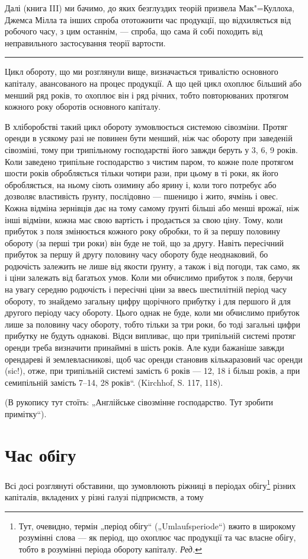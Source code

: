 Далі (книга III) ми бачимо, до яких безглуздих теорій призвела Мак"=Куллоха,
Джемса Мілла та інших спроба ототожнити час продукції, що відхиляється від робочого часу, з
цим останнім, — спроба, що сама й собі походить від неправильного застосування теорії вартости.

\pfbreak

Цикл обороту, що ми розглянули вище, визначається тривалістю основного капіталу, авансованого на
процес продукції. А що цей цикл охоплює більший або менший ряд років, то охоплює він і ряд річних,
тобто повторюваних протягом кожного року оборотів основного капіталу.

В хліборобстві такий цикл обороту зумовлюється системою сівозміни. Протяг оренди в усякому разі не
повинен бути менший, ніж час обороту при заведеній сівозміні, тому при трипільному господарстві його
завжди беруть у 3, 6, 9 років. Коли заведено трипільне господарство з чистим паром, то кожне поле
протягом шости років обробляється тільки чотири рази, при цьому в ті роки, як його обробляється, на
ньому сіють озимину або ярину і, коли того потребує або дозволяє властивість ґрунту, послідовно —
пшеницю і жито, ячмінь і овес. Кожна відміна зернівців дає на тому самому ґрунті більші або менші
врожаї, ніж інші відміни, кожна має свою вартість і продається за свою ціну. Тому, коли прибуток з
поля змінюється кожного року обробки, то й за першу половину обороту (за перші три роки) він буде не
той, що за другу. Навіть пересічний прибуток за першу й другу половину часу обороту буде
неоднаковий, бо родючість залежить не лише від якости ґрунту, а також і від погоди, так само, як і
ціни залежать від багатьох умов. Коли ми обчислимо прибуток з поля, беручи на увагу середню
родючість і пересічні ціни за ввесь шестилітній період часу обороту, то знайдемо загальну цифру
щорічного прибутку і для першого й для другого періоду часу обороту. Цього однак не буде, коли ми
обчислимо прибуток лише за половину часу обороту, тобто тільки за три роки, бо тоді загальні цифри
прибутку не будуть однакові. Відси випливає, що при трипільній системі протяг оренди треба визначити
принаймні в шість років. Але куди бажаніше завжди орендареві й землевласникові, щоб час оренди
становив кількаразовий час оренди (sic!), отже, при трипільній системі замість 6 років — 12, 18 і
більш років, а при семипільній замість 7--14, 28 років“. (Kirchhof, S. 117, 118).

(В рукопису тут стоїть: „Англійське сівозмінне господарство. Тут зробити примітку“).

\section{Час обігу}

Всі досі розглянуті обставини, що зумовлюють ріжниці в періодах обігу\footnote{
Тут, очевидно, термін „період обігу“ („Umlaufsperiode“) вжито в широкому розумінні слова — як
період, що охоплює час продукції та час власне обігу, тобто в розумінні періода обороту капіталу.
\emph{Ред.}
} різних капіталів, вкладених у
різні галузі підприємств, а тому
\parbreak{}  %
